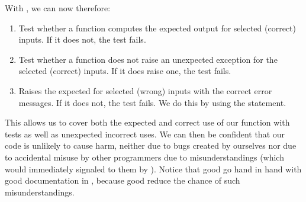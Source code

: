 %
With \pytest, we can now therefore:%
%
\begin{enumerate}%
%
\item Test whether a function computes the expected output for selected (correct) inputs. %
If it does not, the test fails.%
%
\item Test whether a function does not raise an unexpected exception for the selected (correct) inputs. %
If it does raise one, the test fails.%
%
\item Raises the expected  for selected (wrong) inputs with the correct error messages. %
If it does not, the test fails. %
We do this by using the  statement.%
%
\end{enumerate}%
%
This allows us to cover both the expected and correct use of our function with tests as well as unexpected incorrect uses.
We can then be confident that our code is unlikely to cause harm, neither due to bugs created by ourselves nor due to accidental misuse by other programmers due to misunderstandings (which would immediately signaled to them by ).
Notice that good  go hand in hand with good documentation in , because good  reduce the chance of such misunderstandings.%
%
%
%
\FloatBarrier%
\endhsection%
%
%
%
